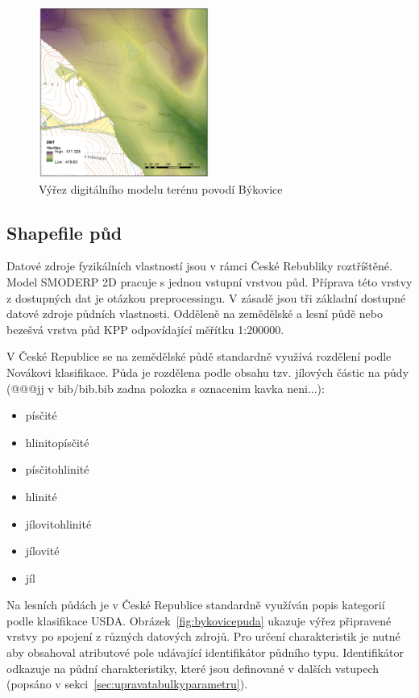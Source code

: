 \begin{figure}
  \centering
  \includegraphics[width=0.5\textwidth]{./img/DMT_byk.png}
  \caption{Výřez digitálního modelu terénu povodí Býkovice}
  \label{fig:bykovicedmt}
\end{figure}

 
\subsection{Shapefile půd} \label{sec:vstuppuda}

Datové zdroje fyzikálních vlastností jsou v rámci České Rebubliky roztříštěné. Model SMODERP 2D pracuje s jednou vstupní vrstvou půd. Příprava této vrstvy z dostupných dat je otázkou preprocessingu. V zásadě jsou tři základní dostupné datové zdroje půdních vlastnosti. Odděleně na zemědělské a lesní půdě nebo bezešvá vrstva půd KPP odpovídající měřítku 1:200000.

V České Republice se na zemědělské půdě standardně využívá rozdělení podle Novákovi klasifikace. Půda je rozdělena podle obsahu tzv. jílových částic na půdy \cite{kavka} (@@@jj v bib/bib.bib zadna polozka s oznacenim kavka neni...):
\begin{itemize} \itemsep 0pt
  \item písčité
  \item hlinitopísčité
  \item písčitohlinité
  \item hlinité
  \item jílovitohlinité
  \item jílovité
  \item jíl
\end{itemize}

Na lesních půdách je v České Republice standardně využíván popis kategorií podle klasifikace USDA.
Obrázek~\ref{fig:bykovicepuda} ukazuje výřez připravené vrstvy po spojení z různých datových zdrojů. Pro určení charakteristik je nutné aby obsahoval atributové pole udávající identifikátor půdního typu. Identifikátor odkazuje na půdní charakteristiky, které jsou definované v dalších vstupech (popsáno v sekci~\ref{sec:upravatabulkyparametru}).


